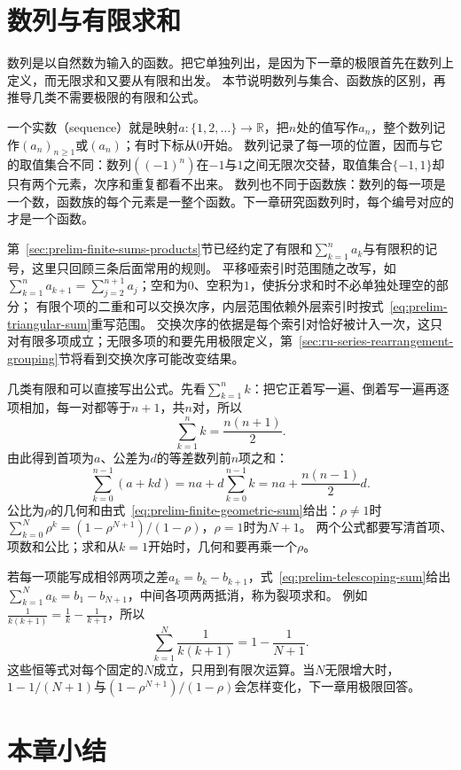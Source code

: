 \section{数列与有限求和}
\label{sec:ru-sequences-finite-sums}

数列是以自然数为输入的函数。把它单独列出，是因为下一章的极限首先在数列上定义，而无限求和又要从有限和出发。
本节说明数列与集合、函数族的区别，再推导几类不需要极限的有限和公式。

一个实数（sequence）就是映射$a:\{1,2,\ldots\}\to\mathbb R$，把$n$处的值写作$a_n$，整个数列记作$(a_n)_{n\geq1}$或$(a_n)$；有时下标从$0$开始。
数列记录了每一项的位置，因而与它的取值集合不同：数列$((-1)^n)$在$-1$与$1$之间无限次交替，取值集合$\{-1,1\}$却只有两个元素，次序和重复都看不出来。
数列也不同于函数族：数列的每一项是一个数，函数族的每个元素是一整个函数。下一章研究函数列时，每个编号对应的才是一个函数。

第~\ref{sec:prelim-finite-sums-products}节已经约定了有限和$\sum_{k=1}^na_k$与有限积的记号，这里只回顾三条后面常用的规则。
平移哑索引时范围随之改写，如$\sum_{k=1}^{n}a_{k+1}=\sum_{j=2}^{n+1}a_j$；空和为$0$、空积为$1$，使拆分求和时不必单独处理空的部分；
有限个项的二重和可以交换次序，内层范围依赖外层索引时按式~\eqref{eq:prelim-triangular-sum}重写范围。
交换次序的依据是每个索引对恰好被计入一次，这只对有限多项成立；无限多项的和要先用极限定义，第~\ref{sec:ru-series-rearrangement-grouping}节将看到交换次序可能改变结果。

几类有限和可以直接写出公式。先看$\sum_{k=1}^nk$：把它正着写一遍、倒着写一遍再逐项相加，每一对都等于$n+1$，共$n$对，所以
\[
 \sum_{k=1}^nk=\frac{n(n+1)}2.
\]
由此得到首项为$a$、公差为$d$的等差数列前$n$项之和：
\[
 \sum_{k=0}^{n-1}(a+kd)=na+d\sum_{k=0}^{n-1}k=na+\frac{n(n-1)}2d.
\]
公比为$\rho$的几何和由式~\eqref{eq:prelim-finite-geometric-sum}给出：$\rho\neq1$时$\sum_{k=0}^N\rho^k=(1-\rho^{N+1})/(1-\rho)$，$\rho=1$时为$N+1$。
两个公式都要写清首项、项数和公比；求和从$k=1$开始时，几何和要再乘一个$\rho$。

若每一项能写成相邻两项之差$a_k=b_k-b_{k+1}$，式~\eqref{eq:prelim-telescoping-sum}给出$\sum_{k=1}^Na_k=b_1-b_{N+1}$，中间各项两两抵消，称为裂项求和。
例如$\frac1{k(k+1)}=\frac1k-\frac1{k+1}$，所以
\[
 \sum_{k=1}^N\frac1{k(k+1)}=1-\frac1{N+1}.
\]
这些恒等式对每个固定的$N$成立，只用到有限次运算。当$N$无限增大时，$1-1/(N+1)$与$(1-\rho^{N+1})/(1-\rho)$会怎样变化，下一章用极限回答。

\FloatBarrier
\section{本章小结}
\label{sec:real-complex-functions-summary}

